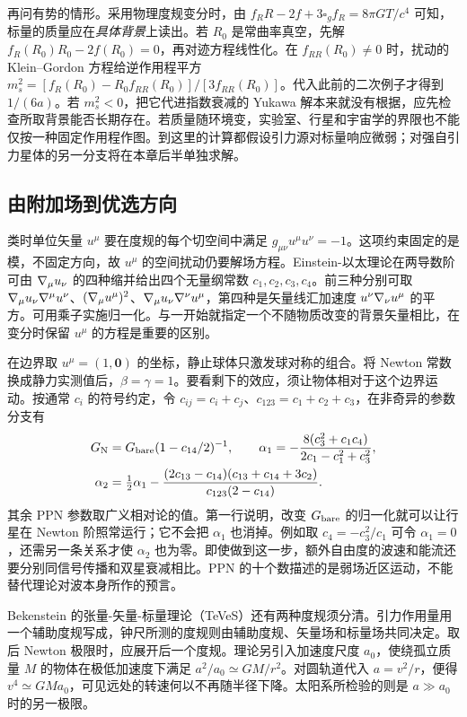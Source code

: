 再问有势的情形。采用物理度规变分时，由 $f_R R-2f+3\square_g f_R=8\pi G T/c^4$ 可知，标量的质量应在\emph{具体背景}上读出。若 $R_0$ 是常曲率真空，先解 $f_R(R_0)R_0-2f(R_0)=0$，再对迹方程线性化。在 $f_{RR}(R_0)\ne0$ 时，扰动的 Klein--Gordon 方程给逆作用程平方 $m_s^2=[f_R(R_0)-R_0f_{RR}(R_0)]/[3f_{RR}(R_0)]$。代入此前的二次例子才得到 $1/(6a)$。若 $m_s^2<0$，把它代进指数衰减的 Yukawa 解本来就没有根据，应先检查所取背景能否长期存在。若质量随环境变，实验室、行星和宇宙学的界限也不能仅按一种固定作用程作图。到这里的计算都假设引力源对标量响应微弱；对强自引力星体的另一分支将在本章后半单独求解。

\subsection{由附加场到优选方向}

类时单位矢量 $u^\mu$ 要在度规的每个切空间中满足 $g_{\mu\nu}u^\mu u^\nu=-1$。这项约束固定的是模，不固定方向，故 $u^\mu$ 的空间扰动仍要解场方程。Einstein-以太理论在两导数阶可由 $\nabla_\mu u_\nu$ 的四种缩并给出四个无量纲常数 $c_1,c_2,c_3,c_4$。前三种分别可取 $\nabla_\mu u_\nu\nabla^\mu u^\nu$、$(\nabla_\mu u^\mu)^2$、$\nabla_\mu u_\nu\nabla^\nu u^\mu$，第四种是矢量线汇加速度 $u^\nu\nabla_\nu u^\mu$ 的平方。可用乘子实施归一化。与一开始就指定一个不随物质改变的背景矢量相比，在变分时保留 $u^\mu$ 的方程是重要的区别。

在边界取 $u^\mu=(1,\bm0)$ 的坐标，静止球体只激发球对称的组合。将 Newton 常数换成静力实测值后，$\beta=\gamma=1$。要看剩下的效应，须让物体相对于这个边界运动。按通常 $c_i$ 的符号约定，令 $c_{ij}=c_i+c_j$、$c_{123}=c_1+c_2+c_3$，在非奇异的参数分支有
\begin{align*}
 G_{\rm N}&=G_{\rm bare}(1-c_{14}/2)^{-1},\qquad
 \alpha_1=-\frac{8(c_3^2+c_1c_4)}{2c_1-c_1^2+c_3^2},\\
 \alpha_2&=\tfrac12\alpha_1-
 \frac{(2c_{13}-c_{14})(c_{13}+c_{14}+3c_2)}
 {c_{123}(2-c_{14})}.
\end{align*}
其余 PPN 参数取广义相对论的值。第一行说明，改变 $G_{\rm bare}$ 的归一化就可以让行星在 Newton 阶照常运行；它不会把 $\alpha_1$ 也消掉。例如取 $c_4=-c_3^2/c_1$ 可令 $\alpha_1=0$，还需另一条关系才使 $\alpha_2$ 也为零。即使做到这一步，额外自由度的波速和能流还要分别同信号传播和双星衰减相比。PPN 的十个数描述的是弱场近区运动，不能替代理论对波本身所作的预言。

Bekenstein 的张量-矢量-标量理论（TeVeS）还有两种度规须分清。引力作用量用一个辅助度规写成，钟尺所测的度规则由辅助度规、矢量场和标量场共同决定。取后 Newton 极限时，应展开后一个度规。理论另引入加速度尺度 $a_0$，使绕孤立质量 $M$ 的物体在极低加速度下满足 $a^2/a_0\simeq GM/r^2$。对圆轨道代入 $a=v^2/r$，便得 $v^4\simeq GMa_0$，可见远处的转速何以不再随半径下降。太阳系所检验的则是 $a\gg a_0$ 时的另一极限。

